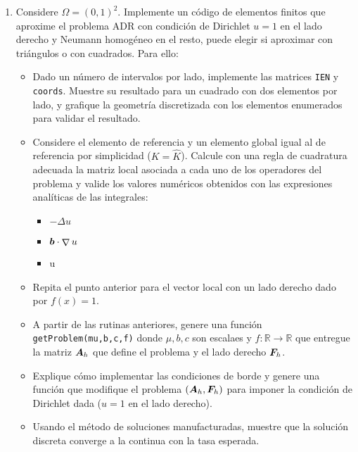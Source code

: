 \documentclass{article}
\renewcommand{\vec}{\vectorsym}
\newcommand{\mat}{\matrixsym}
\DeclareMathOperator{\grad}{\nabla}
\newcommand{\R}{\mathbb{R}}
\newcommand{\pts}[1]{[{\bf #1 puntos}] }
\begin{document}
\begin{enumerate}
    \item Considere $\Omega = (0,1)^2$. Implemente un código de elementos finitos que aproxime el problema ADR con condición de Dirichlet $u=1$ en el lado derecho y Neumann homogéneo en el resto, puede elegir si aproximar con triángulos o con cuadrados. Para ello: 
            \begin{itemize}
                \item\pts{1} Dado un número de intervalos por lado, implemente las matrices \texttt{IEN} y \texttt{coords}. Muestre su resultado para un cuadrado con dos elementos por lado, y grafique la geometría discretizada con los elementos enumerados para validar el resultado.
                \item\pts{3} Considere el elemento de referencia y un elemento global igual al de referencia por simplicidad ($K = \hat K$). Calcule con una regla de cuadratura adecuada la matriz local asociada a cada uno de los operadores del problema y valide los valores numéricos obtenidos con las expresiones analíticas de las integrales: 
                    \begin{itemize}
                        \item $-\Delta u$
                        \item $\vec b \cdot \grad u$
                        \item u
                    \end{itemize}
                \item\pts{2} Repita el punto anterior para el vector local con un lado derecho dado por $f(x) = 1$. 
                \item\pts{3} A partir de las rutinas anteriores, genere una función \texttt{getProblem(mu,b,c,f)} donde $\mu,b,c$ son escalaes y $f:\R\to\R$ que entregue la matriz $\mat A_h$ que define el problema y el lado derecho $\vec F_h$.
                \item\pts{2} Explique cómo implementar las condiciones de borde y genere una función que modifique el problema $(\mat A_h, \vec F_h)$ para imponer la condición de Dirichlet dada ($u=1$ en el lado derecho).
                \item\pts{3} Usando el método de soluciones manufacturadas, muestre que la solución discreta converge a la continua con la tasa esperada.
            \end{itemize}
\end{enumerate}

\end{document}

